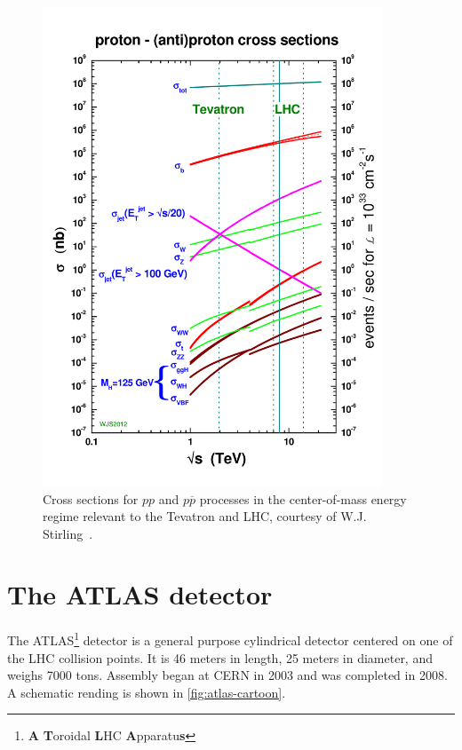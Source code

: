 \begin{figure}[tp]
  \centering
  \includegraphics[width=0.90\textwidth]{figures/lhc-atlas/crosssections2012_v5}
  \caption{Cross sections for $pp$ and $p\overline{p}$ processes in the center-of-mass energy regime relevant to the Tevatron and LHC, courtesy of W.J. Stirling~\cite{2013.stirling.cross-sections}.}
  \label{fig:lhc-stirling}
\end{figure}

\section{The ATLAS detector}
\label{sec:atlas}

The ATLAS\footnote{\textbf{A} \textbf{T}oroidal \textbf{L}HC \textbf{A}pparatu\textbf{s}} detector is a general purpose cylindrical detector centered on one of the LHC collision points. It is 46 meters in length, 25 meters in diameter, and weighs 7000 tons. Assembly began at CERN in 2003 and was completed in 2008. A schematic rending is shown in \cref{fig:atlas-cartoon}.

